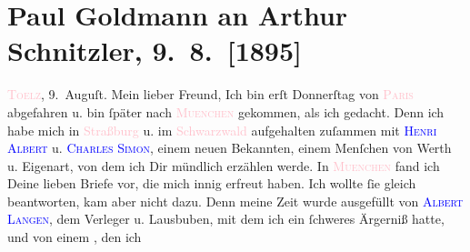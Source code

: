

               \section[Paul Goldmann an Arthur Schnitzler, 9. 8. {[}1895{]}]{ Paul Goldmann an Arthur Schnitzler, 9. 8. {[}1895{]}}\nopagebreak{}\rehead{ }\normalsize\beginnumbering{} \toendnotes[C]{\smallbreak\pagebreak[2]} 
\toendnotes[C]{\smallbreak}\pstart
           \raggedleft{}{\pb}\textsc{\textcolor{pink}{Toelz}{}\ledrightnote{\textcolor{pink}{Bad Tölz}}}, 9. Auguſt.\pend
           \pstart\center{}Mein lieber Freund,\pend\pstart
           Ich bin erſt Donnerſtag von \textsc{\textcolor{pink}{Paris}{}\ledrightnote{\textcolor{pink}{Paris}}} abgefahren u. bin ſpäter nach \textsc{\textcolor{pink}{Muenchen}{}\ledrightnote{\textcolor{pink}{München}}} gekommen, als ich gedacht. Denn ich habe mich in \textcolor{pink}{Straßburg}{}\ledrightnote{\textcolor{pink}{Straßburg}} u. im \textcolor{pink}{Schwarzwald}{}\ledrightnote{\textcolor{pink}{Schwarzwald}}
               aufgehalten zuſammen mit \textsc{\textcolor{blue}{Henri Albert}{}\ledrightnote{\textcolor{blue}{Henri Albert}}} u. \textsc{\textcolor{blue}{Charles Simon}{}\ledrightnote{\textcolor{blue}{Charles Simon}}}, einem neuen Bekannten, einem Menſchen von {\pb}Werth u. Eigenart, von dem ich Dir mündlich erzählen werde.\pend
           \pstart
           In \textsc{\textcolor{pink}{Muenchen}{}\ledrightnote{\textcolor{pink}{München}}} fand ich Deine lieben Briefe vor, die mich innig erfreut haben. Ich wollte ſie
               gleich beantworten, kam aber nicht dazu. Denn meine Zeit wurde ausgefüllt von \textsc{\textcolor{blue}{Albert Langen}{}\ledrightnote{\textcolor{blue}{Albert Langen}}}, dem Verleger u. Lausbuben, mit dem ich ein ſchweres Ärgerniß hatte, und von
               einem \label{K_L02743-1v}\label{K_L02743-1h}, den ich
